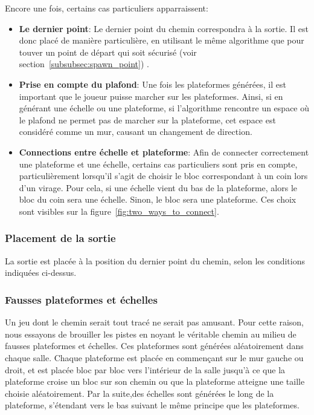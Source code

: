 \documentclass[10pt]{report}
\begin{document}
Encore une fois, certains cas particuliers apparraissent:
\begin{itemize}
  \item \textbf{Le dernier point}: Le dernier point du chemin correspondra à la sortie.
  Il est donc placé de manière particulière, en utilisant le
  même algorithme que pour touver un point de départ qui soit sécurisé (voir section~\ref{subsubsec:spawn_point})  .
  \item \textbf{Prise en compte du plafond}: Une fois les plateformes
  générées, il est important que le joueur puisse marcher sur les plateformes.
  Ainsi, si en générant une échelle ou une plateforme, si
  l'algorithme rencontre un espace où le plafond ne permet pas de marcher
  sur la plateforme, cet espace est considéré comme un mur, causant un
  changement de direction.
  \item \textbf{Connections entre échelle et plateforme}: Afin de connecter
  correctement une plateforme et une échelle, certains cas particuliers
  sont pris en compte, particulièrement lorsqu'il s'agit de choisir le bloc
  correspondant à un coin lors d'un virage.
  Pour cela, si une échelle vient du bas de la plateforme, alors le bloc du coin sera une échelle.
  Sinon, le bloc sera une plateforme.
  Ces choix sont visibles sur la figure~\ref{fig:two_ways_to_connect}.
\end{itemize}

\subsubsection{Placement de la sortie}

La sortie est placée à la position du dernier point du chemin, selon
les conditions indiquées ci-dessus.

\subsubsection{Fausses plateformes et échelles}

Un jeu dont le chemin serait tout tracé ne serait pas amusant.
Pour cette raison, nous essayons de brouiller les pistes en noyant le
véritable chemin au milieu de fausses plateformes et échelles.
Ces plateformes sont générées aléatoirement dans chaque salle.
Chaque plateforme est placée en commençant sur le mur gauche ou droit,
et est placée bloc par bloc vers l'intérieur de la salle jusqu'à ce
que la plateforme croise un bloc sur son chemin ou
que la plateforme atteigne une taille choisie aléatoirement.
Par la suite,des échelles sont générées le long de la plateforme,
s'étendant vers le bas suivant le même principe que les plateformes.
\end{document}
